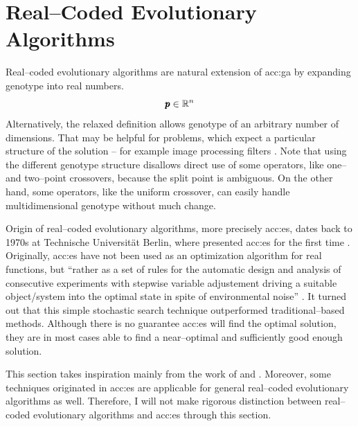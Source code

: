 \section{Real--Coded Evolutionary Algorithms}
\label{chap:realcodedea}

Real--coded evolutionary algorithms are natural extension of \acrshort{acc:ga} by expanding genotype into real numbers.
$$
\pmb{p} \in \mathbb{R}^{n}
$$
Alternatively, the relaxed definition allows genotype of an arbitrary number of dimensions. That may be helpful for problems, which expect a particular structure of the solution -- for example image processing filters \citep{WVDF}. Note that using the different genotype structure disallows direct use of some operators, like one-- and two--point crossovers, because the split point is ambiguous. On the other hand, some operators, like the uniform crossover, can easily handle multidimensional genotype without much change.

Origin of real--coded evolutionary algorithms, more precisely \acrfull{acc:es}, dates back to 1970s at Technische Universität Berlin, where \citeauthor*{ES-original} presented \acrshort{acc:es} for the first time \citep{ES-original}. Originally, \acrshort{acc:es} have not been used as an optimization algorithm for real functions, but \enquote{rather as a set of rules for the automatic design and analysis of consecutive experiments with stepwise variable adjustement driving a suitable object/system into the optimal state in spite of environmental noise} \citep{EScomprehensiveintroduction}. It turned out that this simple stochastic search technique outperformed traditional--based methods. Although there is no guarantee \acrshort{acc:es} will find the optimal solution, they are in most cases able to find a near--optimal and sufficiently good enough solution.

This section takes inspiration mainly from the work of \citet*{IntroductionToEA} and \citet*{EScomprehensiveintroduction}. Moreover, some techniques originated in \acrshort{acc:es} are applicable for general real--coded evolutionary algorithms as well. Therefore, I will not make rigorous distinction between real--coded evolutionary algorithms and \acrshort{acc:es} through this section.

